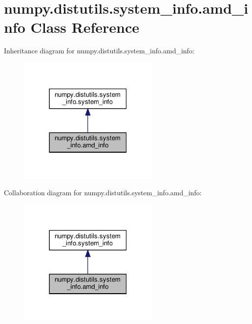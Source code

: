 \hypertarget{classnumpy_1_1distutils_1_1system__info_1_1amd__info}{}\section{numpy.\+distutils.\+system\+\_\+info.\+amd\+\_\+info Class Reference}
\label{classnumpy_1_1distutils_1_1system__info_1_1amd__info}


Inheritance diagram for numpy.\+distutils.\+system\+\_\+info.\+amd\+\_\+info\+:
\nopagebreak
\begin{figure}[H]
\begin{center}
\leavevmode
\includegraphics[width=198pt]{classnumpy_1_1distutils_1_1system__info_1_1amd__info__inherit__graph}
\end{center}
\end{figure}


Collaboration diagram for numpy.\+distutils.\+system\+\_\+info.\+amd\+\_\+info\+:
\nopagebreak
\begin{figure}[H]
\begin{center}
\leavevmode
\includegraphics[width=198pt]{classnumpy_1_1distutils_1_1system__info_1_1amd__info__coll__graph}
\end{center}
\end{figure}
